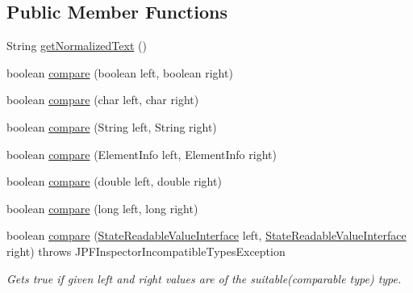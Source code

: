\subsection*{Public Member Functions}
\begin{DoxyCompactItemize}
\item 
String \hyperlink{classgov_1_1nasa_1_1jpf_1_1inspector_1_1server_1_1programstate_1_1relop_1_1_rel_op_not_equal_afbc268b8759659de23f54b045df71311}{get\+Normalized\+Text} ()
\item 
boolean \hyperlink{classgov_1_1nasa_1_1jpf_1_1inspector_1_1server_1_1programstate_1_1relop_1_1_rel_op_not_equal_ad43188d412e20b8e2625fed36b75d2fd}{compare} (boolean left, boolean right)
\item 
boolean \hyperlink{classgov_1_1nasa_1_1jpf_1_1inspector_1_1server_1_1programstate_1_1relop_1_1_rel_op_not_equal_a1064996021999e014ac7344c5ab5ae7d}{compare} (char left, char right)
\item 
boolean \hyperlink{classgov_1_1nasa_1_1jpf_1_1inspector_1_1server_1_1programstate_1_1relop_1_1_rel_op_not_equal_a64bc5489f9f6b3f7d54d8b468e3b1a84}{compare} (String left, String right)
\item 
boolean \hyperlink{classgov_1_1nasa_1_1jpf_1_1inspector_1_1server_1_1programstate_1_1relop_1_1_rel_op_not_equal_a91afc95686639fc66390c1b865eb491d}{compare} (Element\+Info left, Element\+Info right)
\item 
boolean \hyperlink{classgov_1_1nasa_1_1jpf_1_1inspector_1_1server_1_1programstate_1_1relop_1_1_rel_op_not_equal_ae881a24c10225388b6af83dccb8a8341}{compare} (double left, double right)
\item 
boolean \hyperlink{classgov_1_1nasa_1_1jpf_1_1inspector_1_1server_1_1programstate_1_1relop_1_1_rel_op_not_equal_a435cfe760e518010dfe8d12ffc960223}{compare} (long left, long right)
\item 
boolean \hyperlink{classgov_1_1nasa_1_1jpf_1_1inspector_1_1server_1_1programstate_1_1relop_1_1_rel_op_equal_base_a89a8988e7ff80fd175542cf45f5f18d3}{compare} (\hyperlink{interfacegov_1_1nasa_1_1jpf_1_1inspector_1_1server_1_1programstate_1_1_state_readable_value_interface}{State\+Readable\+Value\+Interface} left, \hyperlink{interfacegov_1_1nasa_1_1jpf_1_1inspector_1_1server_1_1programstate_1_1_state_readable_value_interface}{State\+Readable\+Value\+Interface} right)  throws J\+P\+F\+Inspector\+Incompatible\+Types\+Exception 
\begin{DoxyCompactList}\small\item\em Gets true if given left and right values are of the suitable(comparable type) type. \end{DoxyCompactList}\end{DoxyCompactItemize}
